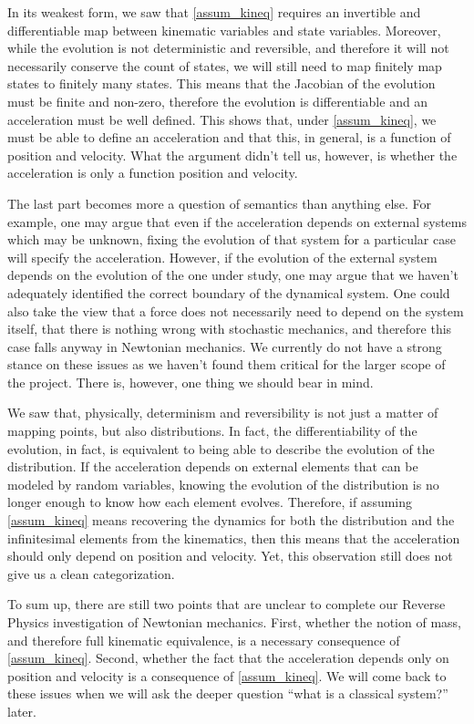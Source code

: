 In its weakest form, we saw that \ref{assum_kineq} requires an invertible and differentiable map between kinematic variables and state variables. Moreover, while the evolution is not deterministic and reversible, and therefore it will not necessarily conserve the count of states, we will still need to map finitely map states to finitely many states. This means that the Jacobian of the evolution must be finite and non-zero, therefore the evolution is differentiable and an acceleration must be well defined. This shows that, under \ref{assum_kineq}, we must be able to define an acceleration and that this, in general, is a function of position and velocity. What the argument didn't tell us, however, is whether the acceleration is only a function position and velocity.

The last part becomes more a question of semantics than anything else. For example, one may argue that even if the acceleration depends on external systems which may be unknown, fixing the evolution of that system for a particular case will specify the acceleration. However, if the evolution of the external system depends on the evolution of the one under study, one may argue that we haven't adequately identified the correct boundary of the dynamical system. One could also take the view that a force does not necessarily need to depend on the system itself, that there is nothing wrong with stochastic mechanics, and therefore this case falls anyway in Newtonian mechanics. We currently do not have a strong stance on these issues as we haven't found them critical for the larger scope of the project. There is, however, one thing we should bear in mind.

We saw that, physically, determinism and reversibility is not just a matter of mapping points, but also distributions. In fact, the differentiability of the evolution, in fact, is equivalent to being able to describe the evolution of the distribution. If the acceleration depends on external elements that can be modeled by random variables, knowing the evolution of the distribution is no longer enough to know how each element evolves. Therefore, if assuming \ref{assum_kineq} means recovering the dynamics for both the distribution and the infinitesimal elements from the kinematics, then this means that the acceleration should only depend on position and velocity. Yet, this observation still does not give us a clean categorization.

To sum up, there are still two points that are unclear to complete our Reverse Physics investigation of Newtonian mechanics. First, whether the notion of mass, and therefore full kinematic equivalence, is a necessary consequence of \ref{assum_kineq}. Second, whether the fact that the acceleration depends only on position and velocity is a consequence of \ref{assum_kineq}. We will come back to these issues when we will ask the deeper question ``what is a classical system?'' later.

